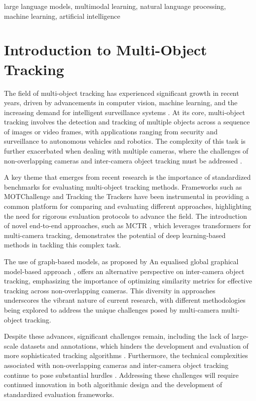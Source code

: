 \documentclass[conference]{IEEEtran}
\begin{document}
\begin{IEEEkeywords}
large language models, multimodal learning, natural language processing, machine learning, artificial intelligence
\end{IEEEkeywords}


\section{Introduction to Multi-Object Tracking}
The field of multi-object tracking has experienced significant growth in recent years, driven by advancements in computer vision, machine learning, and the increasing demand for intelligent surveillance systems \cite{MOTChallenge}. At its core, multi-object tracking involves the detection and tracking of multiple objects across a sequence of images or video frames, with applications ranging from security and surveillance to autonomous vehicles and robotics. The complexity of this task is further exacerbated when dealing with multiple cameras, where the challenges of non-overlapping cameras and inter-camera object tracking must be addressed \cite{Challenge of Multi-Camera Tracking}. 

A key theme that emerges from recent research is the importance of standardized benchmarks for evaluating multi-object tracking methods. Frameworks such as MOTChallenge \cite{MOTChallenge} and Tracking the Trackers \cite{Tracking the Trackers} have been instrumental in providing a common platform for comparing and evaluating different approaches, highlighting the need for rigorous evaluation protocols to advance the field. The introduction of novel end-to-end approaches, such as MCTR \cite{MCTR}, which leverages transformers for multi-camera tracking, demonstrates the potential of deep learning-based methods in tackling this complex task.

The use of graph-based models, as proposed by An equalised global graphical model-based approach \cite{An equalised global graphical model-based approach}, offers an alternative perspective on inter-camera object tracking, emphasizing the importance of optimizing similarity metrics for effective tracking across non-overlapping cameras. This diversity in approaches underscores the vibrant nature of current research, with different methodologies being explored to address the unique challenges posed by multi-camera multi-object tracking.

Despite these advances, significant challenges remain, including the lack of large-scale datasets and annotations, which hinders the development and evaluation of more sophisticated tracking algorithms \cite{MOTChallenge}. Furthermore, the technical complexities associated with non-overlapping cameras and inter-camera object tracking continue to pose substantial hurdles \cite{Challenge of Multi-Camera Tracking}. Addressing these challenges will require continued innovation in both algorithmic design and the development of standardized evaluation frameworks.
\end{document}
